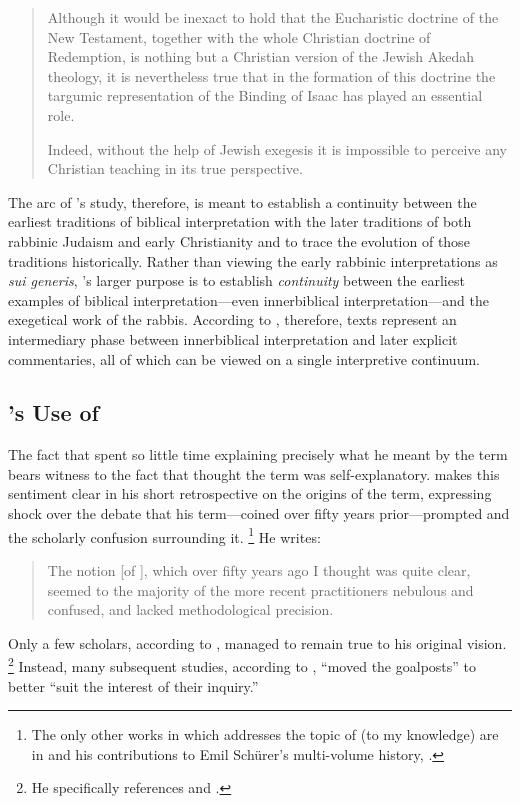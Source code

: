 \begin{quote}
    Although it would be inexact to hold that the Eucharistic doctrine of the New Testament, together with the whole Christian doctrine of Redemption, is nothing but a Christian version of the Jewish Akedah theology, it is nevertheless true that in the formation of this doctrine the targumic representation of the Binding of Isaac has played an essential role. 
    
    Indeed, without the help of Jewish exegesis it is impossible to perceive any Christian teaching in its true perspective.%
    \autocite[227]{vermes1961}
\end{quote} 
\noindent
The arc of \vermes's study, therefore, is meant to establish a continuity between the earliest traditions of biblical interpretation with the later traditions of both rabbinic Judaism and early Christianity and to trace the evolution of those traditions historically. Rather than viewing the early rabbinic interpretations as \emph{sui generis}, \vermes's larger purpose is to establish \emph{continuity} between the earliest examples of biblical interpretation---even innerbiblical interpretation---and the exegetical work of the rabbis. According to \vermes, therefore, \rwb texts represent an intermediary phase between innerbiblical interpretation and later explicit commentaries, all of which can be viewed on a single interpretive continuum.

\subsection{\vermes's Use of \rwb} 

The fact that \vermes spent so little time explaining precisely what he meant by the term \rwb bears witness to the fact that \vermes thought the term was self-explanatory. \vermes makes this sentiment clear in his short retrospective on the origins of the term, expressing shock over the debate that his term---coined over fifty years prior---prompted and the scholarly confusion surrounding it.%
    \footnote{%
        The only other works in which \vermes addresses the topic of \rwb (to my knowledge) are in 
        \cite{vermes_eretz-israel1989} and his contributions to Emil Schürer's multi-volume history, 
        \cite{schurer1986}.}
He writes: 
\begin{quote}
    The notion [of \rwb], which over fifty years ago I thought was quite clear, seemed to the majority of the more recent practitioners nebulous and confused, and lacked methodological precision.%
    \autocite[3]{vermes_zsengeller2014}
\end{quote} 
\noindent
%
Only a few scholars, according to \vermes, managed to remain true to his original vision.%
    \footnote{%
        He specifically references
        \cite{alexander_carson-williamson1988} and 
        \cite{bernstein_textus2005}.}
%
Instead, many subsequent studies, according to \vermes, ``moved the goalposts'' to better ``suit the interest of their inquiry.''%
    \autocite[4]{vermes_zsengeller2014}

